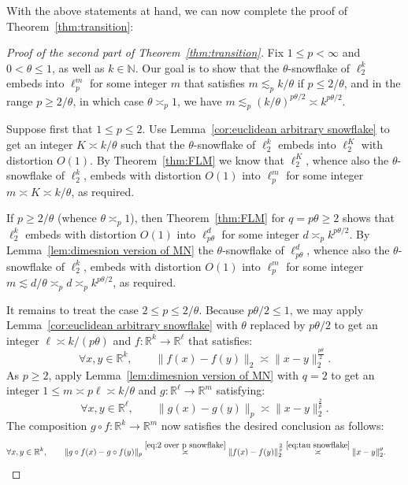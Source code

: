 \documentclass[11pt,reqno]{amsart}
\newcommand{\R}{\mathbb{R}}
\newcommand{\N}{\mathbb{N}}
\renewcommand{\le}{\leqslant}
\renewcommand{\ge}{\geqslant}
\newcommand{\1}{\mathbf{1}}
\begin{document}
With the above statements at hand, we can now complete the proof  of Theorem~\ref{thm:transition}:  


\begin{proof}[Proof of  the second part of Theorem~\ref{thm:transition}] Fix  $1\le p<\infty$ and $0<\theta\le 1$, as well as $k\in \N$. Our goal is to show that the $\theta$-snowflake of $\ell_2^k$ embeds into $\ell_p^m$ for some integer $m$ that satisfies $m\lesssim_p k/\theta$ if $p\le 2/\theta$, and in the range  $p\ge 2/\theta$, in which case $\theta\asymp_p 1$,  we have  $m\lesssim_p (k/\theta)^{p\theta/2}\asymp k^{p\theta/2}$. 


Suppose first that $1\le p\le 2$. Use Lemma~\ref{cor:euclidean arbitrary snowflake}  to get an integer $K\asymp k/\theta$ such that the $\theta$-snowflake of $\ell_2^k$ embeds into $\ell_2^K$ with distortion $O(1)$. By Theorem~\ref{thm:FLM} we know that $\ell_2^K$, whence also the $\theta$-snowflake of $\ell_2^k$, embeds with distortion $O(1)$ into $\ell_p^m$ for some integer $m\asymp K\asymp k/\theta$, as required. 

If $p\ge 2/\theta$ (whence $\theta\asymp_p 1$), then  Theorem~\ref{thm:FLM} for $q=p\theta\ge 2$ shows that $\ell_2^k$ embeds with distortion $O(1)$  into $\ell_{p\theta }^d$ for some integer $d\asymp_{p} k^{p \theta /2}$. By Lemma~\ref{lem:dimesnion version of MN}  the $\theta$-snowflake of $\ell_{p\theta}^d$, whence also the $\theta$-snowflake of $\ell_2^k$, embeds with distortion $O(1)$ into $\ell_p^{m}$ for some integer $m\lesssim d/\theta\asymp_p d\asymp_p k^{p\theta/2}$, as required.  



It remains to treat the case  $2\le p\le 2/\theta$.  Because $p\theta/2\le 1$, we may apply Lemma~\ref{cor:euclidean arbitrary snowflake} with $\theta$ replaced by $p\theta/2$ to get an integer $\ell\asymp k/(p\theta)$ and  $f: \R^k\to \R^\ell$ that satisfies:  
\begin{equation}\label{eq:tau snowflake}
\forall x,y\in \R^k,\qquad \|f(x)-f(y)\|_2\asymp \|x-y\|_2^{\frac{p\theta}{2}}.
\end{equation}
As $p\ge 2$,  apply Lemma~\ref{lem:dimesnion version of MN} with $q=2$ to get an integer $1\le m\asymp p\ell\asymp k/\theta$  and $g:\R^\ell\to \R^m$ satisfying:
\begin{equation}\label{eq:2 over p snowflake}
\forall x,y\in \R^\ell,\qquad \|g(x)-g(y)\|_p\asymp \|x-y\|_2^{\frac{2}{p}}.
\end{equation}
The composition $g\circ f:\R^k\to \R^m$ now satisfies the desired conclusion as follows: 
\begin{equation*}
\forall x,y\in \R^k,\qquad \|g\circ f(x)-g\circ f(y)\|_p\stackrel{\eqref{eq:2 over p snowflake}}{\asymp} \|f(x)-f(y)\|_2^{\frac{2}{p}} \stackrel{\eqref{eq:tau snowflake}}{\asymp} \|x-y\|_2^\theta. \tag*{\qedhere}
\end{equation*}
\end{proof}
\end{document}
